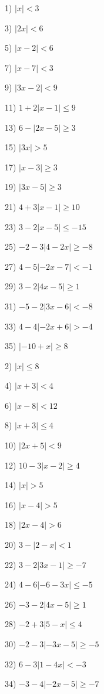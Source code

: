 \begin{multicols}{2}
  1) $| x | < 3$
  
  3) $| 2 x| < 6$
  
  5) $| x - 2| < 6$
  
  7) $|x - 7| < 3$
  
  9) $|3x - 2| < 9$
  
  11) $1 + 2 |x - 1| \leq 9$
  
  13) $6 - |2x - 5| \geq 3$
  
  15) $|3x| > 5$
  
  17) $| x - 3| \geq 3$
  
  19) $| 3 x - 5| \geq 3$
  
  21) $4 + 3 |x - 1| \geq 10$
  
  23) $3 - 2 |x - 5| \leq - 15$
  
  25) $- 2 - 3 |4 - 2 x| \geq - 8$
  
  27) $4 - 5| - 2 x - 7| < - 1$
  
  29) $3 - 2 |4x - 5| \geq 1$
  
  31) $- 5 - 2 |3x - 6| < - 8$
  
  33) $4 - 4| - 2 x + 6| > - 4$
  
  35) $| - 10 + x | \geq 8$
  
  2) $| x | \leq 8$
  
  4) $| x + 3| < 4$
  
  6) $|x - 8| < 12$
  
  8) $|x + 3| \leq 4$
  
  10) $|2x + 5| < 9$
  
  12) $10 - 3 |x - 2| \geq 4$
  
  14) $|x| > 5$
  
  16) $| x - 4| > 5$
  
  18) $| 2 x - 4| > 6$
  
  20) $3 - |2 - x| < 1$
  
  22) $3 - 2 |3x - 1| \geq - 7$
  
  24) $4 - 6| - 6 - 3 x| \leq - 5$
  
  26) $- 3 - 2 |4x - 5| \geq 1$
  
  28) $- 2 + 3 |5 - x| \leq 4$
  
  30) $- 2 - 3| - 3 x - 5| \geq - 5$
  
  32) $6 - 3 |1 - 4 x| < - 3$
  
  34) $- 3 - 4| - 2 x - 5| \geq - 7$
  
\end{multicols}